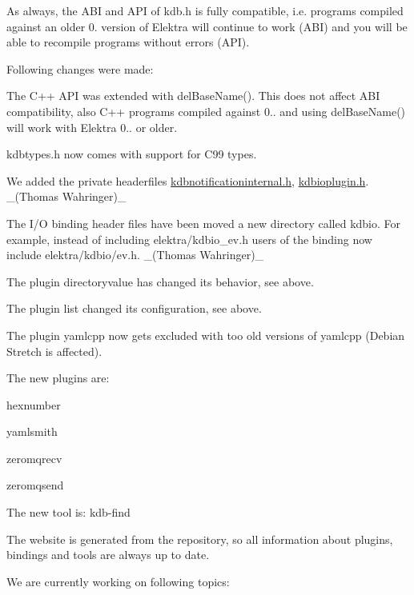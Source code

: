 As always, the A\+BI and A\+PI of kdb.\+h is fully compatible, i.\+e. programs compiled against an older 0. version of Elektra will continue to work (A\+BI) and you will be able to recompile programs without errors (A\+PI).

Following changes were made\+:


\begin{DoxyItemize}
\item The C++ A\+PI was extended with {\ttfamily del\+Base\+Name()}. This does not affect A\+BI compatibility, also C++ programs compiled against 0.. and using {\ttfamily del\+Base\+Name()} will work with Elektra 0.. or older.
\item {\ttfamily kdbtypes.\+h} now comes with support for C99 types.
\item We added the private headerfiles {\ttfamily \hyperlink{kdbnotificationinternal_8h}{kdbnotificationinternal.\+h}}, {\ttfamily \hyperlink{kdbioplugin_8h}{kdbioplugin.\+h}}. \+\_\+(\+Thomas Wahringer)\+\_\+
\item The I/O binding header files have been moved a new directory called {\ttfamily kdbio}. For example, instead of including {\ttfamily elektra/kdbio\+\_\+ev.\+h} users of the binding now include {\ttfamily elektra/kdbio/ev.\+h}. \+\_\+(\+Thomas Wahringer)\+\_\+
\item The plugin directoryvalue has changed its behavior, see above.
\item The plugin list changed its configuration, see above.
\item The plugin yamlcpp now gets excluded with too old versions of yamlcpp (Debian Stretch is affected).
\end{DoxyItemize}

The new plugins are\+:


\begin{DoxyItemize}
\item hexnumber
\item yamlsmith
\item zeromqrecv
\item zeromqsend
\end{DoxyItemize}

The new tool is\+: kdb-\/find

The website is generated from the repository, so all information about plugins, bindings and tools are always up to date.

We are currently working on following topics\+:


